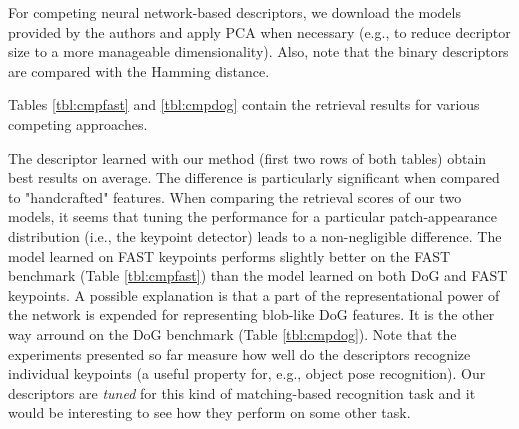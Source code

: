 \documentclass[twocolumn]{article}
\begin{document}
			For competing neural network-based descriptors, we download the models provided by the authors and apply PCA when necessary
			(e.g., to reduce decriptor size to a more manageable dimensionality).
			Also, note that the binary descriptors are compared with the Hamming distance.

			Tables \ref{tbl:cmpfast} and \ref{tbl:cmpdog} contain the retrieval results for various competing approaches.
			
			The descriptor learned with our method (first two rows of both tables) obtain best results on average.
			The difference is particularly significant when compared to "handcrafted" features.
			When comparing the retrieval scores of our two models, it seems that tuning the performance for a particular patch-appearance distribution (i.e., the keypoint detector) leads to a non-negligible difference.
			The model learned on FAST keypoints performs slightly better on the FAST benchmark (Table \ref{tbl:cmpfast}) than the model learned on both DoG and FAST keypoints.
			A possible explanation is that a part of the representational power of the network is expended for representing blob-like DoG features.
			It is the other way arround on the DoG benchmark (Table \ref{tbl:cmpdog}).
			Note that the experiments presented so far measure how well do the descriptors recognize individual keypoints (a useful property for, e.g., object pose recognition).
			Our descriptors are \textit{tuned} for this kind of matching-based recognition task and it would be interesting to see how they perform on some other task.
\end{document}
